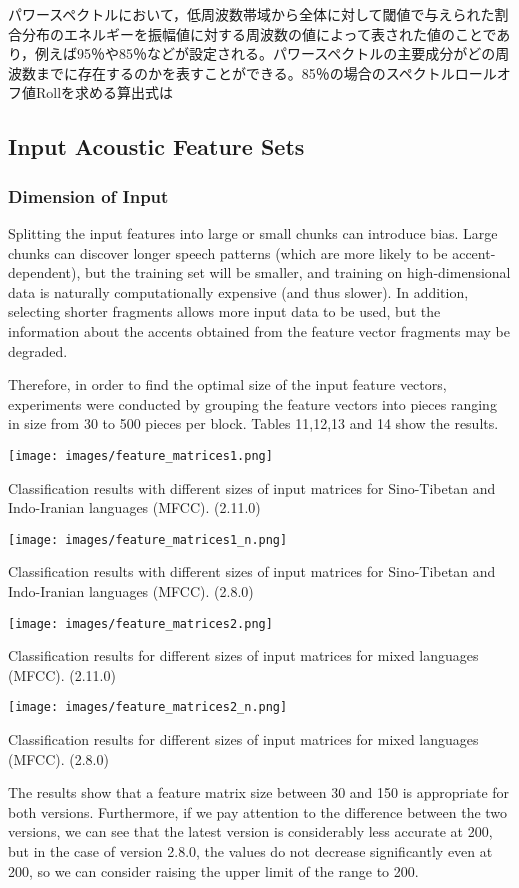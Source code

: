 パワースペクトルにおいて，低周波数帯域から全体に対して閾値で与えられた割合分布のエネルギーを振幅値に対する周波数の値によって表された値のことであり，例えば95％や85％などが設定される。パワースペクトルの主要成分がどの周波数までに存在するのかを表すことができる。85％の場合のスペクトルロールオフ値Rollを求める算出式は\documentclass[ams]{U-AizuGT}
\begin{document}
\subsection{Input Acoustic Feature Sets}
\subsubsection{Dimension of Input}
Splitting the input features into large or small chunks can introduce bias. Large chunks can discover longer speech patterns (which are more likely to be accent-dependent), but the training set will be smaller, and training on high-dimensional data is naturally computationally expensive (and thus slower). In addition, selecting shorter fragments allows more input data to be used, but the information about the accents obtained from the feature vector fragments may be degraded.\par
Therefore, in order to find the optimal size of the input feature vectors, experiments were conducted by grouping the feature vectors into pieces ranging in size from 30 to 500 pieces per block. Tables 11,12,13 and 14 show the results.
\begin{table}[h]
    \centering
    \texttt{[image: images/feature\_matrices1.png]}
    \caption{Classification results with different sizes of input matrices for Sino-Tibetan and Indo-Iranian languages (MFCC). (2.11.0)}
\end{table}
\begin{table}[h]
    \centering
    \texttt{[image: images/feature\_matrices1\_n.png]}
    \caption{Classification results with different sizes of input matrices for Sino-Tibetan and Indo-Iranian languages (MFCC). (2.8.0)}
\end{table}

\begin{table}[h]
    \centering
    \texttt{[image: images/feature\_matrices2.png]}
    \caption{Classification results for different sizes of input matrices for mixed languages (MFCC). (2.11.0)}
\end{table}
\begin{table}[h]
    \centering
    \texttt{[image: images/feature\_matrices2\_n.png]}
    \caption{Classification results for different sizes of input matrices for mixed languages (MFCC). (2.8.0)}
\end{table}

The results show that a feature matrix size between 30 and 150 is appropriate for both versions. Furthermore, if we pay attention to the difference between the two versions, we can see that the latest version is considerably less accurate at 200, but in the case of version 2.8.0, the values do not decrease significantly even at 200, so we can consider raising the upper limit of the range to 200.
\end{document}
